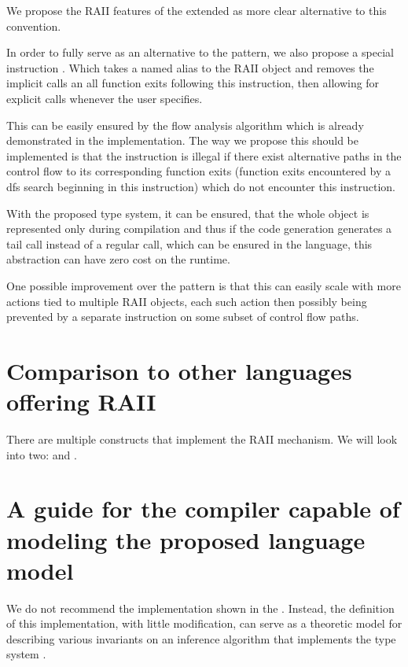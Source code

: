 We propose the RAII features of the extended \cmm as more clear alternative to this convention.

In order to fully serve as an alternative to the  pattern, we also propose a special instruction . Which takes a named alias to the RAII object and removes the implicit calls an all function exits following this instruction, then allowing for explicit calls whenever the user specifies.

This can be easily ensured by the flow analysis algorithm which is already demonstrated in the implementation. The way we propose this should be implemented is that the  instruction is illegal if there exist alternative paths in the control flow to its corresponding function exits (function exits encountered by a dfs search beginning in this instruction) which do not encounter this instruction.

With the proposed type system, it can be ensured, that the whole object is represented only during compilation and thus if the code generation generates a tail call instead of a regular call, which can be ensured in the \cmm language, this abstraction can have zero cost on the runtime.

One possible improvement over the  pattern is that this can easily scale with more actions tied to multiple RAII objects, each such action then possibly being prevented by a separate  instruction on some subset of control flow paths.

\section{Comparison to other languages offering RAII}

There are multiple constructs that implement the RAII mechanism. We will look into two:  and .

\section{A guide for the compiler capable of modeling the proposed language model}

We do not recommend the implementation shown in the . Instead, the definition of this implementation, with little modification, can serve as a theoretic model for describing various invariants on an inference algorithm that implements the type system .

